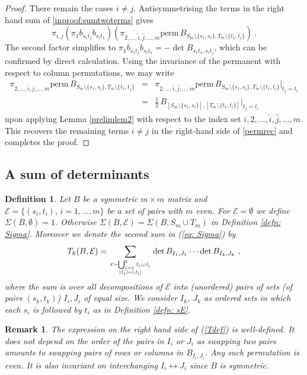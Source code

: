 \documentclass[10pt]{amsart}
\newcommand{\sE}{\mathcal{E}}
\newcommand{\perm}{\mathrm{perm}\,}
\theoremstyle{plain}
\newtheorem{remark}[thm]{Remark}
\newtheorem{defn}[thm]{Definition}
\newcommand{\0}{\color{blue}{\mathsf{0}}}
\begin{document}
\begin{proof}
There remain the cases $i\neq j$. Antisymmetrising  the terms in the right hand sum of   \eqref{inproof:sumtwoterms} gives
\[ \pi_{i,j}\left(\pi_1b_{s_1t_j}b_{s_it_1}\right)\left(\pi_{2,\ldots,\hat{i},\hat{j},\ldots,m}\perm 
B_{S_m\setminus \{s_1,s_i\},T_m\setminus \{t_1,t_j\}}   \right)\ . \] 
The second factor simplifies to  $\pi_1b_{s_1t_j}b_{s_it_1}=-\det B_{s_1t_1,s_it_j}$, 
which can be confirmed by direct calculation.
Using the invariance of the permanent with respect to column permutations, we may write 
\begin{eqnarray} \pi_{2,\ldots,\hat{i},\hat{j},\ldots,m}\perm 
B_{S_m\setminus \{s_1,s_i\},T_m\setminus \{t_1,t_j\}}  & = &   \pi_{2,\ldots,\hat{i},\hat{j},\ldots,m}\perm 
B_{S_m\setminus \{s_1,s_i\},T_m\setminus \{t_1,t_i\}} \Big|_{t_j=t_i}    \nonumber \\
& = &  \frac{1}{2}\,   B_{[S_m\setminus \{s_1,s_i\}],[T_m\setminus \{t_1,t_i\}]} \Big|_{t_j=t_i}       \nonumber 
\end{eqnarray} upon applying   Lemma \ref{prelimlem2} with respect to the index set $i,2,\ldots,\hat{i},\hat{j},\ldots,m$. 
This recovers the remaining terms $i\neq j$ in the right-hand side of \eqref{permrec} and completes the proof. 
\end{proof}

\subsection{A sum of determinants}
\begin{defn}\label{Sigmadefn}
Let $B$ be a symmetric $m\times m$ matrix and $\sE=\{(s_i,t_i),\,i=1,\ldots,m\}$ be a set of pairs  with $m$ even. For $\sE=\emptyset$ we define $\Sigma(B,\emptyset)=1$. Otherwise $\Sigma(B,\sE)=\Sigma(B,S_m\cup T_m)$ in Definition \ref{defn: Sigma}. Moreover we denote the
second sum in (\ref{eq: Sigma}) by
\begin{equation} \label{Tdef}
T_k(B, \sE) = \sum_{\genfrac{}{}{0pt}{}{\sE=\bigcup_{i=1}^kI_i\cup J_i}{|I_i|=|J_i|}}\det B_{I_1,J_1}\cdots\det B_{I_k,J_k}\ ,
\end{equation}
where the sum is over all decompositions of $\sE$ into (unordered) pairs of sets (of pairs $(s_k,t_k)$) $I_i, J_i$ of equal size. 
We consider $I_k$, $J_k$ as ordered sets in which each $s_i$ is followed by $t_i$ as in  Definition  \ref{defn: sE}.
\end{defn}

\begin{remark}\label{symrk}
The expression on the right hand side of (\ref{Tdef}) is well-defined. It does not depend on the order of the pairs in $I_i$ or $J_i$ as swapping two pairs amounts to
swapping pairs of rows or columns in $B_{I_i,J_i}$. Any such permutation is even.
It is also  invariant on interchanging  $I_i\leftrightarrow J_i$ since $B$ is symmetric.
\end{remark}
\end{document}
